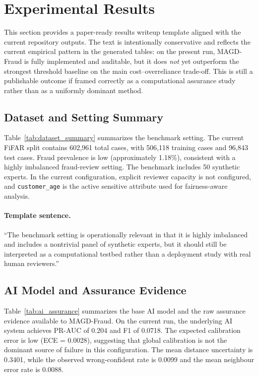 \section{Experimental Results}
\label{sec:results}

This section provides a paper-ready results writeup template aligned with the current repository outputs. The text is intentionally conservative and reflects the current empirical pattern in the generated tables: on the present run, MAGD-Fraud is fully implemented and auditable, but it does \emph{not} yet outperform the strongest threshold baseline on the main cost--overreliance trade-off. This is still a publishable outcome if framed correctly as a computational assurance study rather than as a uniformly dominant method.

\subsection{Dataset and Setting Summary}
\label{subsec:results_setting}

Table~\ref{tab:dataset_summary} summarizes the benchmark setting. The current FiFAR split contains 602{,}961 total cases, with 506{,}118 training cases and 96{,}843 test cases. Fraud prevalence is low (approximately 1.18\%), consistent with a highly imbalanced fraud-review setting. The benchmark includes 50 synthetic experts. In the current configuration, explicit reviewer capacity is not configured, and \texttt{customer\_age} is the active sensitive attribute used for fairness-aware analysis.

\paragraph{Template sentence.}
``The benchmark setting is operationally relevant in that it is highly imbalanced and includes a nontrivial panel of synthetic experts, but it should still be interpreted as a computational testbed rather than a deployment study with real human reviewers.''

\subsection{AI Model and Assurance Evidence}
\label{subsec:results_assurance_evidence}

Table~\ref{tab:ai_assurance} summarizes the base AI model and the raw assurance evidence available to MAGD-Fraud. On the current run, the underlying AI system achieves PR-AUC of 0.204 and F1 of 0.0718. The expected calibration error is low (ECE = 0.0028), suggesting that global calibration is not the dominant source of failure in this configuration. The mean distance uncertainty is 0.3401, while the observed wrong-confident rate is 0.0099 and the mean neighbour error rate is 0.0088.

